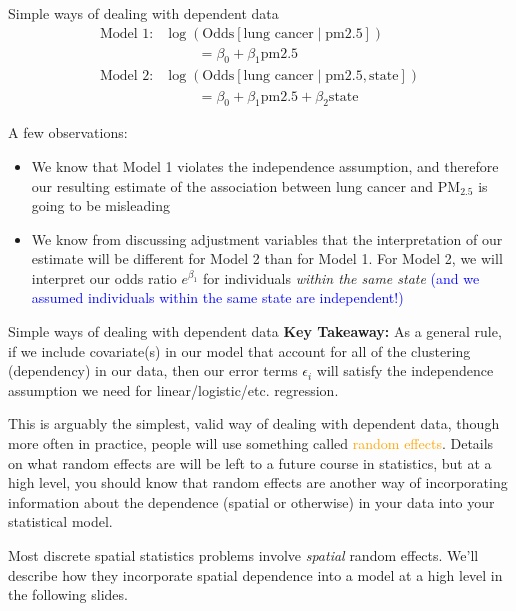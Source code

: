 \documentclass[10pt,t]{beamer}
\begin{document}
\begin{frame}{Simple ways of dealing with dependent data}
\begin{align*}
\text{Model 1:} & \log(\text{Odds}[\text{lung cancer} \mid \text{pm2.5}]) \\
& \hspace{1cm} = \beta_0 + \beta_1  \text{pm2.5} \\
\text{Model 2:} & \log(\text{Odds}[\text{lung cancer} \mid \text{pm2.5}, \text{state}]) \\
& \hspace{1cm} = \beta_0 + \beta_1  \text{pm2.5} + \beta_2 \text{state}
\end{align*}

\vspace{0.3cm}

A few observations:

\begin{itemize}
	\item We know that Model 1 violates the independence assumption, and therefore our resulting estimate of the association between lung cancer and $\text{PM}_{2.5}$ is going to be misleading
	\item We know from discussing adjustment variables that the interpretation of our estimate will be different for Model 2 than for Model 1. For Model 2, we will interpret our odds ratio $e^{\beta_1}$ for individuals \textit{within the same state} \textcolor{blue}{(and we assumed individuals within the same state are independent!)}
\end{itemize}
\end{frame}

\begin{frame}{Simple ways of dealing with dependent data}
\textbf{Key Takeaway:} As a general rule, if we include covariate(s) in our model that account for all of the clustering (dependency) in our data, then our error terms $\epsilon_i$ will satisfy the independence assumption we need for linear/logistic/etc. regression.

\vspace{0.3cm}

This is arguably the simplest, valid way of dealing with dependent data, though more often in practice, people will use something called \textcolor{orange}{random effects}. Details on what random effects are will be left to a future course in statistics, but at a high level, you should know that random effects are another way of incorporating information about the dependence (spatial or otherwise) in your data into your statistical model.

\vspace{0.3cm}

Most discrete spatial statistics problems involve \textit{spatial} random effects. We'll describe how they incorporate spatial dependence into a model at a high level in the following slides.
\end{frame}
\end{document}
